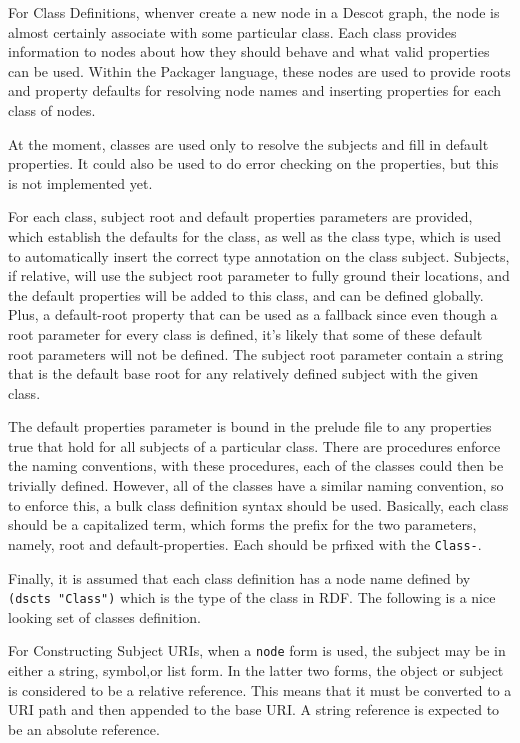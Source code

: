 For Class Definitions, whenver create a new node in a Descot graph, the node is 
almost certainly associate with some particular class. Each class 
provides information to nodes about how they should behave and what valid 
properties can be used. Within the Packager language, these nodes are used 
to provide roots and property defaults for resolving node names and 
inserting properties for each class of nodes.

At the moment, classes are used 
only to resolve the subjects and fill in default properties. It could also be 
used to do error checking on the properties, but this is not implemented yet.


For each class, subject root and default properties parameters are provided, 
which establish the defaults for the class, as well as the class type, which 
is used to automatically insert the correct type annotation on the class 
subject. Subjects, if relative, will use the subject root parameter to fully 
ground their locations, and the default properties will be added to this class, 
and can be defined globally. Plus, a default-root property that can be used as 
a fallback since even though a root parameter for every class is defined, it's 
likely that some of these default root parameters will not be defined. The 
subject root parameter contain a string that is the default base root for any 
relatively defined subject with the given class.

The default properties parameter is bound in the prelude file to 
any properties true that hold for all subjects of a particular class.
There are procedures enforce the naming conventions, with these procedures, 
each of the classes could then be trivially defined. However, all of the
classes have a similar naming convention, so to enforce this, a bulk class 
definition syntax should be used. Basically, each class should be a 
capitalized term, which forms the prefix for the two parameters, namely, 
root and default-properties. Each should be prfixed with the {\tt Class-}.

Finally, it is assumed that each class definition has a node name defined 
by {\tt (dscts "Class")} which is the type of the class in RDF.
The following is a nice looking set of classes definition.

For Constructing Subject URIs, when a {\tt node} form is used, the subject
may be in either a string, symbol,or list form. In the latter two forms, 
the object or subject is considered to be a relative reference. This
means that it must be converted to a URI path and then appended to the 
base URI. A string reference is expected to be an absolute reference.

